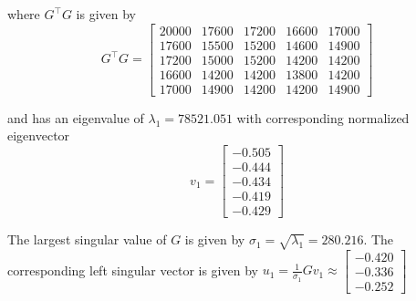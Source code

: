 \begin{homeworkProblem}
\begin{solution}
\begin{itemize}
                where $G^\top G$ is given by
                \[
                    G^\top G = \begin{bmatrix}
                        20000 & 17600 & 17200 & 16600 & 17000 \\
                        17600 & 15500 & 15200 & 14600 & 14900 \\
                        17200 & 15000 & 15200 & 14200 & 14200 \\
                        16600 & 14200 & 14200 & 13800 & 14200 \\
                        17000 & 14900 & 14200 & 14200 & 14900
                    \end{bmatrix}
                \]

                and has an eigenvalue of $\lambda_1 = 78521.051$ with 
                corresponding normalized eigenvector
                \[
                    v_1 = \begin{bmatrix}
                        -0.505 \\ -0.444 \\ -0.434 \\ -0.419 \\ -0.429
                    \end{bmatrix}
                \]

                The largest singular value of $G$ is given by $\sigma_1 =
                \sqrt{\lambda_1} = 280.216$. The corresponding left singular
                vector is given by $u_1 = \frac{1}{\sigma_1} G v_1 \approx
                \begin{bmatrix} -0.420 \\ -0.336 \\ -0.252 \end{bmatrix}$


\end{itemize}
\end{solution}
\end{homeworkProblem}
